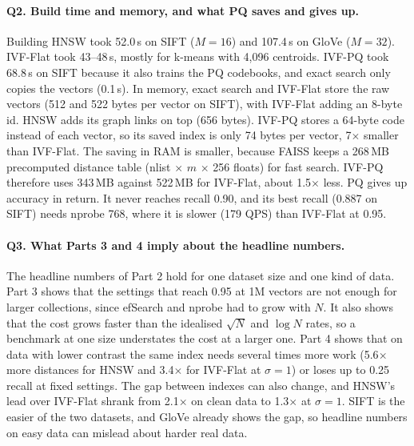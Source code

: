 \documentclass[10pt,a4paper]{article}
\begin{document}
\paragraph{Q2. Build time and memory, and what PQ saves and gives up.}
Building HNSW took 52.0\,s on SIFT ($M = 16$) and 107.4\,s on GloVe ($M = 32$). IVF-Flat took 43--48\,s, mostly for k-means with
4,096 centroids. IVF-PQ took 68.8\,s on SIFT because it also trains the PQ codebooks, and exact search only copies the vectors
(0.1\,s). In memory, exact search and IVF-Flat store the raw vectors (512 and 522 bytes per vector on SIFT), with IVF-Flat adding an
8-byte id. HNSW adds its graph links on top (656 bytes). IVF-PQ stores a 64-byte code instead of each vector, so its saved index is
only 74 bytes per vector, 7$\times$ smaller than IVF-Flat. The saving in RAM is smaller, because FAISS keeps a 268\,MB precomputed
distance table (nlist $\times$ $m$ $\times$ 256 floats) for fast search. IVF-PQ therefore uses 343\,MB against 522\,MB for IVF-Flat,
about 1.5$\times$ less. PQ gives up accuracy in return. It never reaches recall 0.90, and its best recall (0.887 on SIFT) needs
nprobe 768, where it is slower (179 QPS) than IVF-Flat at 0.95.

\paragraph{Q3. What Parts 3 and 4 imply about the headline numbers.}
The headline numbers of Part 2 hold for one dataset size and one kind of data. Part 3 shows that the settings that reach 0.95 at
1M vectors are not enough for larger collections, since efSearch and nprobe had to grow with $N$. It also shows that the cost grows
faster than the idealised $\sqrt{N}$ and $\log N$ rates, so a benchmark at one size understates the cost at a larger one. Part 4
shows that on data with lower contrast the same index needs several times more work (5.6$\times$ more distances for HNSW and
3.4$\times$ for IVF-Flat at $\sigma = 1$) or loses up to 0.25 recall at fixed settings. The gap between indexes can also change, and HNSW's lead over IVF-Flat shrank from 2.1$\times$ on clean data to 1.3$\times$ at $\sigma = 1$. SIFT is the easier of the two datasets,
and GloVe already shows the gap, so headline numbers on easy data can mislead about harder real data.
\end{document}
